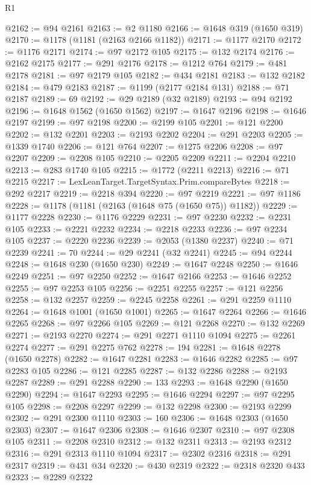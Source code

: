 \begin{lexlean}{R1}
\begin{coremodule}
@2162 := @94 @2161
@2163 := @2 @1180
@2166 := @1648 @319 (@1650 @319)
@2170 := @1178 (@1181 (@2163 @2166 @1182))
@2171 := @1177 @2170
@2172 := @1176 @2171
@2174 := @97 @2172 @105
@2175 := @132 @2174
@2176 := @2162 @2175
@2177 := @291 @2176
@2178 := @1212 @764
@2179 := @481 @2178
@2181 := @97 @2179 @105
@2182 := @434 @2181
@2183 := @132 @2182
@2184 := @479 @2183
@2187 := @1199 (@2177 @2184 @131)
@2188 := @71 @2187
@2189 := 69
@2192 := @29 @2189 (@32 @2189)
@2193 := @94 @2192
@2196 := @1648 @1562 (@1650 @1562)
@2197 := @1647 @2196
@2198 := @1646 @2197
@2199 := @97 @2198
@2200 := @2199 @105
@2201 := @121 @2200
@2202 := @132 @2201
@2203 := @2193 @2202
@2204 := @291 @2203
@2205 := @1339 @1740
@2206 := @121 @764
@2207 := @1275 @2206
@2208 := @97 @2207
@2209 := @2208 @105
@2210 := @2205 @2209
@2211 := @2204 @2210
@2213 := @283 @1740 @105
@2215 := @1772 (@2211 @2213)
@2216 := @71 @2215
@2217 := LexLeanTarget.TargetSyntax.Prim.compareBytes
@2218 := @292 @2217
@2219 := @2218 @394
@2220 := @97 @2219
@2221 := @97 @1186
@2228 := @1178 (@1181 (@2163 (@1648 @75 (@1650 @75)) @1182))
@2229 := @1177 @2228
@2230 := @1176 @2229
@2231 := @97 @2230
@2232 := @2231 @105
@2233 := @2221 @2232
@2234 := @2218 @2233
@2236 := @97 @2234 @105
@2237 := @2220 @2236
@2239 := @2053 (@1380 @2237)
@2240 := @71 @2239
@2241 := 70
@2244 := @29 @2241 (@32 @2241)
@2245 := @94 @2244
@2248 := @1648 @230 (@1650 @230)
@2249 := @1647 @2248
@2250 := @1646 @2249
@2251 := @97 @2250
@2252 := @1647 @2166
@2253 := @1646 @2252
@2255 := @97 @2253 @105
@2256 := @2251 @2255
@2257 := @121 @2256
@2258 := @132 @2257
@2259 := @2245 @2258
@2261 := @291 @2259 @1110
@2264 := @1648 @1001 (@1650 @1001)
@2265 := @1647 @2264
@2266 := @1646 @2265
@2268 := @97 @2266 @105
@2269 := @121 @2268
@2270 := @132 @2269
@2271 := @2193 @2270
@2274 := @291 @2271 @1110 @1094
@2275 := @2261 @2274
@2277 := @291 @2275 @762
@2278 := 194
@2281 := @1648 @2278 (@1650 @2278)
@2282 := @1647 @2281
@2283 := @1646 @2282
@2285 := @97 @2283 @105
@2286 := @121 @2285
@2287 := @132 @2286
@2288 := @2193 @2287
@2289 := @291 @2288
@2290 := 133
@2293 := @1648 @2290 (@1650 @2290)
@2294 := @1647 @2293
@2295 := @1646 @2294
@2297 := @97 @2295 @105
@2298 := @2208 @2297
@2299 := @132 @2298
@2300 := @2193 @2299
@2302 := @291 @2300 @1110
@2303 := 160
@2306 := @1648 @2303 (@1650 @2303)
@2307 := @1647 @2306
@2308 := @1646 @2307
@2310 := @97 @2308 @105
@2311 := @2208 @2310
@2312 := @132 @2311
@2313 := @2193 @2312
@2316 := @291 @2313 @1110 @1094
@2317 := @2302 @2316
@2318 := @291 @2317
@2319 := @431 @34
@2320 := @430 @2319
@2322 := @2318 @2320 @433
@2323 := @2289 @2322

\end{coremodule}
\end{lexlean}

